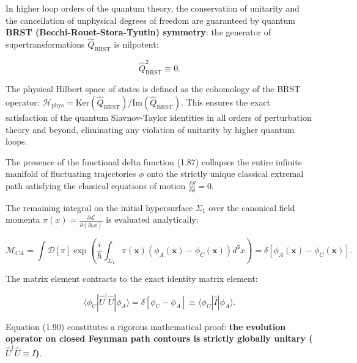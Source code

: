 \begin{enumerate}
In higher loop orders of the quantum theory, the conservation of unitarity and the cancellation of unphysical degrees of freedom are guaranteed by quantum \textbf{BRST (Becchi-Rouet-Stora-Tyutin) symmetry}: the generator of supertransformations $\hat{Q}_{\text{BRST}}$ is nilpotent:

\begin{equation}\label{eq:1.88}\tag{1.88}
\hat{Q}_{\text{BRST}}^2 \equiv 0.
\end{equation}

The physical Hilbert space of states is defined as the cohomology of the BRST operator: $\mathcal{H}_{\text{phys}} = \text{Ker}(\hat{Q}_{\text{BRST}}) / \text{Im}(\hat{Q}_{\text{BRST}})$. This ensures the exact satisfaction of the quantum Slavnov-Taylor identities in all orders of perturbation theory and beyond, eliminating any violation of unitarity by higher quantum loops.

The presence of the functional delta function (1.87) collapses the entire infinite manifold of fluctuating trajectories $\bar{\phi}$ onto the strictly unique classical extremal path satisfying the classical equations of motion $\frac{\delta S}{\delta \phi} = 0$.

The remaining integral on the initial hypersurface $\Sigma_1$ over the canonical field momenta $\pi(x) = \frac{\partial\mathcal{L}}{\partial(\partial_0\phi)}$ is evaluated analytically:

\begin{equation}\label{eq:1.89}\tag{1.89}
\mathcal{M}_{CA} = \int \mathcal{D}[\pi] \exp\left( \frac{i}{\hbar} \int_{\Sigma_1} \pi(\mathbf{x}) \left( \phi_A(\mathbf{x}) - \phi_C(\mathbf{x}) \right) d^3x \right) = \delta\left[ \phi_A(\mathbf{x}) - \phi_C(\mathbf{x}) \right].
\end{equation}

The matrix element contracts to the exact identity matrix element:

\begin{equation}\label{eq:1.90}\tag{1.90}
\langle \phi_C | \hat{U}^\dagger \hat{U} | \phi_A \rangle = \delta[\phi_C - \phi_A] \equiv \langle \phi_C | \hat{I} | \phi_A \rangle.
\end{equation}

Equation (1.90) constitutes a rigorous mathematical proof: \textbf{the evolution operator on closed Feynman path contours is strictly globally unitary ($\hat{U}^\dagger \hat{U} \equiv \hat{I}$)}.
\end{enumerate}

